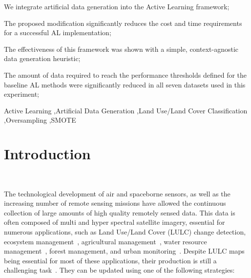 \documentclass[preprint,12pt]{elsarticle}
\begin{document}
\begin{frontmatter}
\begin{highlights}
\item We integrate artificial data generation into the Active Learning
    framework;
\item The proposed modification significantly reduces the cost and time
    requirements for a successful AL implementation;
\item The effectiveness of this framework was shown with a simple,
    context-agnostic data generation heuristic;
\item The amount of data required to reach the performance thresholds defined
    for the baseline AL methods were significantly reduced in all seven
    datasets used in this experiment;
\end{highlights}

\begin{keyword}
Active Learning \sep Artificial Data Generation \sep Land Use/Land Cover
Classification \sep Oversampling \sep SMOTE
\end{keyword}

\end{frontmatter}


\section{Introduction}~\label{sec:introduction}

The technological development of air and spaceborne sensors, as well as the
increasing number of remote sensing missions have allowed the continuous
collection of large amounts of high quality remotely sensed data. This data is
often composed of multi and hyper spectral satellite imagery, essential for
numerous applications, such as Land Use/Land Cover (LULC) change detection,
ecosystem management~\cite{Nagai2020}, agricultural
management~\cite{Huang2018}, water resource management~\cite{Wang2018}, forest
management, and urban monitoring~\cite{Khatami2016}. Despite LULC maps being
essential for most of these applications, their production is still a
challenging task~\cite{Gavade2019, Wulder2018}. They can be updated using
one of the following strategies:
\end{document}
